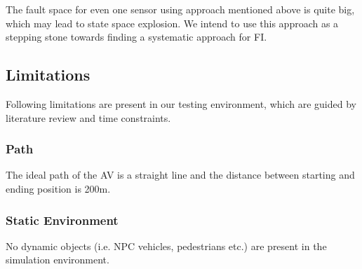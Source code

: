 The fault space for even one sensor using approach mentioned above is quite big, which may lead to state space explosion. We intend to use this approach as a stepping stone towards finding a systematic approach for FI.  

\subsection{Limitations}
Following limitations are present in our testing environment, which are guided by literature review and time constraints.

\subsubsection{Path} The ideal path of the AV is a straight line and the distance between starting and ending position is 200m. 

\subsubsection{Static Environment} No dynamic objects (i.e. NPC vehicles, pedestrians etc.) are present in the simulation environment. 
